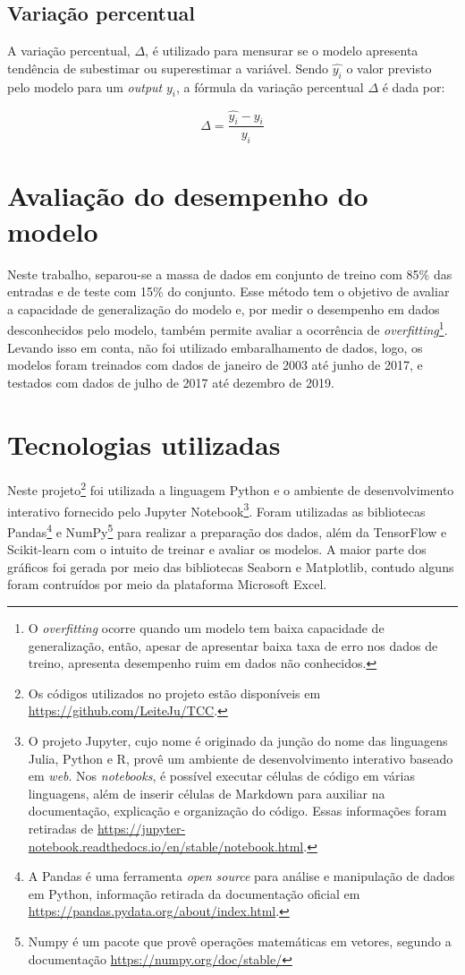\subsection{Variação percentual}

A variação percentual, $\Delta$, é utilizado para mensurar se o 
modelo apresenta tendência de subestimar ou superestimar a variável. 
Sendo $\hat{y_i}$ o valor previsto pelo 
modelo para um \textit{output} $y_i$, a fórmula da variação percentual
$\Delta$ é dada por:

\begin{equation}
    \Delta = \frac{\hat{y_i} - y_i}{y_i}
\end{equation}

\section{Avaliação do desempenho do modelo}

Neste trabalho, separou-se a massa de dados em conjunto de treino com 85\% 
das entradas e de teste com 15\% do conjunto. Esse método tem o objetivo de avaliar
a capacidade de generalização do modelo e, por medir o desempenho em dados 
desconhecidos pelo modelo, também permite avaliar a ocorrência de \textit{overfitting}\footnote{
O \textit{overfitting} ocorre quando um modelo tem baixa capacidade de generalização, 
então, apesar de apresentar baixa taxa de erro nos dados de treino, apresenta 
desempenho ruim em dados não conhecidos.}. Levando isso em conta, não foi utilizado embaralhamento de dados, 
logo, os modelos foram treinados com dados de janeiro de 2003 até junho de 2017,
e testados com dados de julho de 2017 até dezembro de 2019.

\section{Tecnologias utilizadas}

Neste projeto\footnote{Os códigos utilizados no projeto estão disponíveis em \url{https://github.com/LeiteJu/TCC}.} foi utilizada a linguagem Python e  o ambiente de desenvolvimento interativo fornecido pelo Jupyter Notebook\footnote{O projeto Jupyter, cujo nome é originado da junção do nome das linguagens Julia, Python e R, provê um 
ambiente de desenvolvimento interativo baseado em \textit{web}. Nos \textit{notebooks}, é possível executar células de código 
em várias linguagens, além de inserir células de Markdown para auxiliar na documentação, explicação e organização do código. Essas informações foram 
retiradas de \url{https://jupyter-notebook.readthedocs.io/en/stable/notebook.html}.}.
Foram utilizadas as bibliotecas Pandas\footnote{A Pandas é uma ferramenta \textit{open source} para análise e manipulação de dados em Python, informação retirada da documentação oficial em \url{https://pandas.pydata.org/about/index.html}.} e NumPy\footnote{
Numpy é um pacote que provê operações matemáticas em vetores, segundo a documentação \url{https://numpy.org/doc/stable/}
} para realizar a preparação dos dados,
além da TensorFlow e Scikit-learn com o intuito de treinar e avaliar os modelos.
A maior parte dos gráficos foi gerada por meio das bibliotecas 
Seaborn e Matplotlib, contudo alguns foram contruídos por meio da plataforma
Microsoft Excel.
